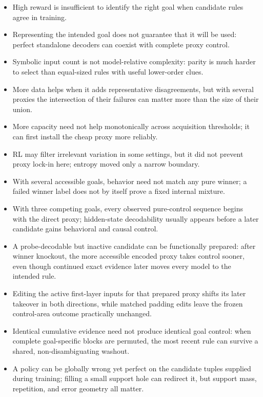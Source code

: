 \documentclass[11pt,a4paper]{article}
\begin{document}
\begin{itemize}[leftmargin=*,itemsep=0.35em]
  \item High reward is insufficient to identify the right goal when candidate rules agree in training.
  \item Representing the intended goal does not guarantee that it will be used: perfect standalone decoders can coexist with complete proxy control.
  \item Symbolic input count is not model-relative complexity: parity is much harder to select than equal-sized rules with useful lower-order clues.
  \item More data helps when it adds representative disagreements, but with several proxies the intersection of their failures can matter more than the size of their union.
  \item More capacity need not help monotonically across acquisition thresholds; it can first install the cheap proxy more reliably.
  \item RL may filter irrelevant variation in some settings, but it did not prevent proxy lock-in here; entropy moved only a narrow boundary.
  \item With several accessible goals, behavior need not match any pure winner; a failed winner label does not by itself prove a fixed internal mixture.
  \item With three competing goals, every observed pure-control sequence begins with the direct proxy; hidden-state decodability usually appears before a later candidate gains behavioral and causal control.
  \item A probe-decodable but inactive candidate can be functionally prepared: after winner knockout, the more accessible encoded proxy takes control sooner, even though continued exact evidence later moves every model to the intended rule.
  \item Editing the active first-layer inputs for that prepared proxy shifts its later takeover in both directions, while matched padding edits leave the frozen control-area outcome practically unchanged.
  \item Identical cumulative evidence need not produce identical goal control: when complete goal-specific blocks are permuted, the most recent rule can survive a shared, non-disambiguating washout.
  \item A policy can be globally wrong yet perfect on the candidate tuples supplied during training; filling a small support hole can redirect it, but support mass, repetition, and error geometry all matter.

\end{itemize}
\end{document}
